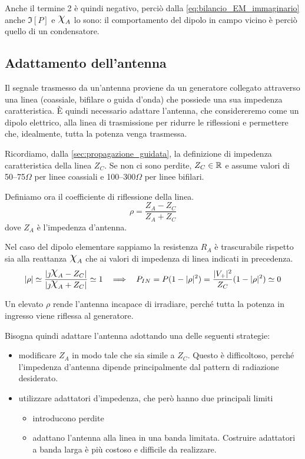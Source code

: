 Anche il termine 2 è quindi negativo, perciò dalla \autoref{eq:bilancio_EM_immaginario} anche $\Im[P]$ e $\Chi_A$ lo sono: il comportamento del dipolo in campo vicino è perciò quello di un condensatore.

\subsection{Adattamento dell'antenna}
Il segnale trasmesso da un'antenna proviene da un generatore collegato attraverso una linea (coassiale, bifilare o guida d'onda) che possiede una sua impedenza caratteristica. È quindi necessario adattare l'antenna, che considereremo come un dipolo elettrico, alla linea di trasmissione per ridurre le riflessioni e permettere che, idealmente, tutta la potenza venga trasmessa.

Ricordiamo, dalla \autoref{sec:propagazione_guidata}, la definizione di impedenza caratteristica della linea $Z_C$.
Se non ci sono perdite, $Z_C \in \mathbb{R}$ e assume valori di 50--75$\Omega$ per linee coassiali e 100--300$\Omega$ per linee bifilari.

Definiamo ora il coefficiente di riflessione della linea.
\begin{equation}
	\rho = \frac{Z_A -Z_C}{Z_A + Z_C}
\end{equation}
dove $Z_A$ è l'impedenza d'antenna.

Nel caso del dipolo elementare sappiamo la resistenza $R_A$ è trascurabile rispetto sia alla reattanza $\Chi_A$ che ai valori di impedenza di linea indicati in precedenza.
\begin{equation*}
	|\rho|
	\simeq \frac{|\jmath \Chi_A -Z_C|}{|\jmath \Chi_A +Z_C|}
	\simeq 1
	~~ \implies ~~
	P_{IN}
	= P(1-|\rho|^2)
	= \frac{|V_+|^2}{Z_C}(1-|\rho|^2) \simeq 0
\end{equation*}

Un elevato $\rho$ rende l'antenna incapace di irradiare, perché tutta la potenza in ingresso viene riflessa al generatore.

Bisogna quindi adattare l'antenna adottando una delle seguenti strategie:
\begin{itemize}
	\item modificare $Z_A$ in modo tale che sia simile a $Z_C$. Questo è difficoltoso, perché l'impedenza d'antenna dipende principalmente dal pattern di radiazione desiderato.
	\item utilizzare adattatori d'impedenza, che però hanno due principali limiti
	\begin{itemize}
		\item introducono perdite
		\item adattano l'antenna alla linea in una banda limitata. Costruire adattatori a banda larga è più costoso e difficile da realizzare.
	\end{itemize}
\end{itemize}

